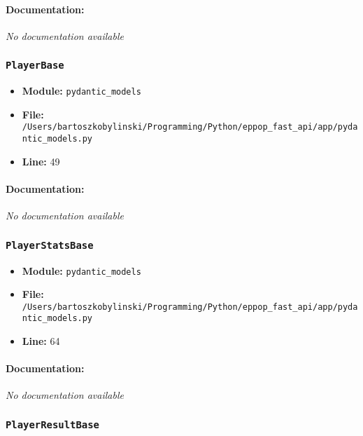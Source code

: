 \documentclass[11pt,a4paper]{article}
\begin{document}
\paragraph{Documentation:} \textit{No documentation available}


\vspace{1em}
\subsubsection{\texttt{PlayerBase}}

\begin{itemize}
    \item \textbf{Module:} \texttt{pydantic\_models}
    \item \textbf{File:} \texttt{/Users/bartoszkobylinski/Programming/Python/eppop\_fast\_api/app/pydantic\_models.py}
    \item \textbf{Line:} 49
\end{itemize}

\paragraph{Documentation:} \textit{No documentation available}


\vspace{1em}
\subsubsection{\texttt{PlayerStatsBase}}

\begin{itemize}
    \item \textbf{Module:} \texttt{pydantic\_models}
    \item \textbf{File:} \texttt{/Users/bartoszkobylinski/Programming/Python/eppop\_fast\_api/app/pydantic\_models.py}
    \item \textbf{Line:} 64
\end{itemize}

\paragraph{Documentation:} \textit{No documentation available}


\vspace{1em}
\subsubsection{\texttt{PlayerResultBase}}
\end{document}

